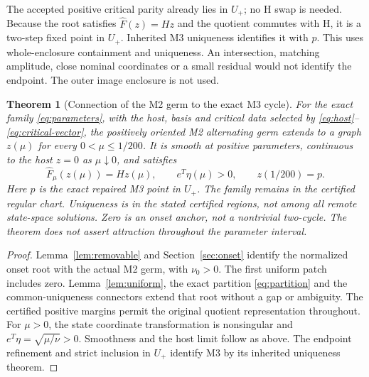 \documentclass[11pt,a4paper]{article}
\numberwithin{equation}{section}
\newtheorem{theorem}{Theorem}[section]
\newcommand{\Fh}{\widehat F}\newcommand{\eps}{\varepsilon}
\begin{document}
The accepted positive critical parity already lies in $U_+$; no H swap is needed. Because the root satisfies $\Fh(z)=Hz$ and the quotient commutes with H, it is a two-step fixed point in $U_+$. Inherited M3 uniqueness identifies it with $p$. This uses whole-enclosure containment and uniqueness. An intersection, matching amplitude, close nominal coordinates or a small residual would not identify the endpoint. The outer image enclosure  is not used.

\begin{theorem}[Connection of the M2 germ to the exact M3 cycle]\label{thm:connection}
For the exact family \eqref{eq:parameters}, with the host, basis and critical data selected by \eqref{eq:host}--\eqref{eq:critical-vector}, the positively oriented M2 alternating germ extends to a graph $z(\mu)$ for every $0<\mu\le1/200$. It is smooth at positive parameters, continuous to the host $z=0$ as $\mu\downarrow0$, and satisfies
\begin{equation}
\Fh_\mu(z(\mu))=Hz(\mu),\qquad
e^T\eta(\mu)>0,\qquad z(1/200)=p.\label{eq:connection-conclusion}
\end{equation}
Here $p$ is the exact repaired M3 point in $U_+$. The family remains in the certified regular chart. Uniqueness is in the stated certified regions, not among all remote state-space solutions. Zero is an onset anchor, not a nontrivial two-cycle. The theorem does not assert attraction throughout the parameter interval.
\end{theorem}
\begin{proof}
Lemma~\ref{lem:removable} and Section~\ref{sec:onset} identify the normalized onset root with the actual M2 germ, with $\nu_0>0$. The first uniform patch includes zero. Lemma~\ref{lem:uniform}, the exact partition \eqref{eq:partition} and the common-uniqueness connectors extend that root without a gap or ambiguity. The certified positive margins permit the original quotient representation throughout. For $\mu>0$, the state coordinate transformation is nonsingular and $e^T\eta=\sqrt{\mu/\nu}>0$. Smoothness and the host limit follow as above. The endpoint refinement and strict inclusion in $U_+$ identify M3 by its inherited uniqueness theorem.
\end{proof}
\end{document}
